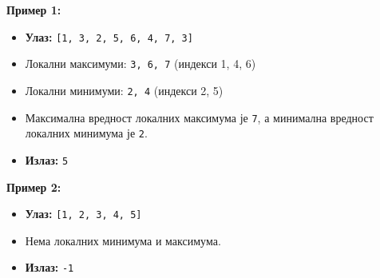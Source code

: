 \textbf{Пример 1:}
\begin{itemize}
    \item \textbf{Улаз:} \texttt{[1, 3, 2, 5, 6, 4, 7, 3]}
    \item Локални максимуми: \texttt{3, 6, 7} (индекси 1, 4, 6)
    \item Локални минимуми: \texttt{2, 4} (индекси 2, 5)
    \item Максимална вредност локалних максимума је \texttt{7}, а минимална вредност локалних минимума је \texttt{2}.
    \item \textbf{Излаз:} \texttt{5}
\end{itemize}

\noindent\textbf{Пример 2:}
\begin{itemize}
    \item \textbf{Улаз:} \texttt{[1, 2, 3, 4, 5]}
    \item Нема локалних минимума и максимума.
    \item \textbf{Излаз:} \texttt{-1}
\end{itemize}

